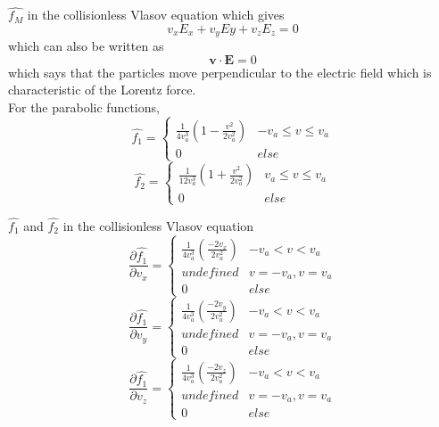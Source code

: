 \documentclass{beamer}
\begin{document}
	\begin{frame}[t]{$\widehat{f_{M}}$ in  the collisionless Vlasov equation}
		which gives
		$$v_{x} E_{x} + v_{y} E{y} + v_{z} E_{z} = 0$$
		which can also be written as 
		\begin{equation}
			\label{eqn:MaxwellInVlasov}
			\textbf{v} \cdot \mathrm{\textbf{E}} = 0
		\end{equation} 
		which says that the particles move perpendicular to the electric field which is characteristic of the Lorentz force.\\
	For the parabolic functions,
	\[ \hat{f_{1}} = 
	\begin{cases} 
		\frac{1}{4 v_{a}^{3}} \left(1 - \frac{v^{2}}{2 v_{a}^2}\right) & -v_{a}\leq v\leq v_{a} \\
		0 & else 
	\end{cases}
	\]
	\[ \hat{f_{2}} = 
	\begin{cases}
		\frac{1}{12 v_{a}^{3}} \left(1 + \frac{v^{2}}{2 v_{a}^2}\right) & v_{a}\leq v\leq v_{a} \\
		0 & else
	\end{cases}\]
	\end{frame}

	\begin{frame}[t]{$\hat{f_{1}}$ and $\hat{f_{2}}$ in  the collisionless Vlasov equation}
	\[ \frac{\displaystyle \partial \hat{f_{1}}}{\displaystyle \partial v_{x}} = 
	\begin{cases} 
		\frac{1}{4 v_{a}^{3}} \left(\frac{- 2 v_{x}}{2 v_{a}^2}\right) & -v_{a} < v < v_{a} \\
		undefined & v = - v_{a}, v = v_{a} \\
		0 & else 
	\end{cases}
	\]
	\[ \frac{\displaystyle \partial \hat{f_{1}}}{\displaystyle \partial v_{y}} = 
	\begin{cases} 
		\frac{1}{4 v_{a}^{3}} \left(\frac{- 2 v_{y}}{2 v_{a}^2}\right) & -v_{a} < v < v_{a} \\
		undefined & v = - v_{a}, v = v_{a} \\
		0 & else 
	\end{cases}
	\]
	\[ \frac{\displaystyle \partial \hat{f_{1}}}{\displaystyle \partial v_{z}} = 
	\begin{cases} 
		\frac{1}{4 v_{a}^{3}} \left(\frac{- 2 v_{z}}{2 v_{a}^2}\right) & -v_{a} < v < v_{a} \\
		undefined & v = - v_{a}, v = v_{a} \\
		0 & else 
	\end{cases}
	\]
	
	
	\end{frame}
\end{document}
